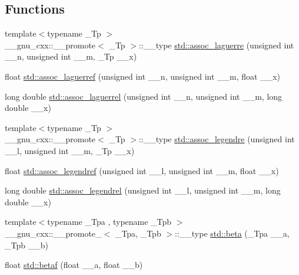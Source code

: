 \subsection*{Functions}
\begin{DoxyCompactItemize}
\item 
{\footnotesize template$<$typename \+\_\+\+Tp $>$ }\\\+\_\+\+\_\+gnu\+\_\+cxx\+::\+\_\+\+\_\+promote$<$ \+\_\+\+Tp $>$\+::\+\_\+\+\_\+type \hyperlink{group__tr29124__math__spec__func_ga377bb7e038c464a27dfe0573fd2d7b33}{std\+::assoc\+\_\+laguerre} (unsigned int \+\_\+\+\_\+n, unsigned int \+\_\+\+\_\+m, \+\_\+\+Tp \+\_\+\+\_\+x)
\item 
float \hyperlink{group__tr29124__math__spec__func_gaf83d98f350a1cfcebee6a1f723cf90d2}{std\+::assoc\+\_\+laguerref} (unsigned int \+\_\+\+\_\+n, unsigned int \+\_\+\+\_\+m, float \+\_\+\+\_\+x)
\item 
long double \hyperlink{group__tr29124__math__spec__func_gac8e245671fb2df5de5fd978d03081f6c}{std\+::assoc\+\_\+laguerrel} (unsigned int \+\_\+\+\_\+n, unsigned int \+\_\+\+\_\+m, long double \+\_\+\+\_\+x)
\item 
{\footnotesize template$<$typename \+\_\+\+Tp $>$ }\\\+\_\+\+\_\+gnu\+\_\+cxx\+::\+\_\+\+\_\+promote$<$ \+\_\+\+Tp $>$\+::\+\_\+\+\_\+type \hyperlink{group__tr29124__math__spec__func_ga355349f79119c1fd1e2a9351cec57f0f}{std\+::assoc\+\_\+legendre} (unsigned int \+\_\+\+\_\+l, unsigned int \+\_\+\+\_\+m, \+\_\+\+Tp \+\_\+\+\_\+x)
\item 
float \hyperlink{group__tr29124__math__spec__func_ga3ced07ddd24bf4af56e2712d148e7f57}{std\+::assoc\+\_\+legendref} (unsigned int \+\_\+\+\_\+l, unsigned int \+\_\+\+\_\+m, float \+\_\+\+\_\+x)
\item 
long double \hyperlink{group__tr29124__math__spec__func_ga55977b425a539146f060dec1c8003344}{std\+::assoc\+\_\+legendrel} (unsigned int \+\_\+\+\_\+l, unsigned int \+\_\+\+\_\+m, long double \+\_\+\+\_\+x)
\item 
{\footnotesize template$<$typename \+\_\+\+Tpa , typename \+\_\+\+Tpb $>$ }\\\+\_\+\+\_\+gnu\+\_\+cxx\+::\+\_\+\+\_\+promote\+\_$<$ \+\_\+\+Tpa, \+\_\+\+Tpb $>$\+::\+\_\+\+\_\+type \hyperlink{group__tr29124__math__spec__func_ga6a7220c87c942db48b18b527d92bbd2d}{std\+::beta} (\+\_\+\+Tpa \+\_\+\+\_\+a, \+\_\+\+Tpb \+\_\+\+\_\+b)
\item 
float \hyperlink{group__tr29124__math__spec__func_ga12dc61ee4c09172151cf092ed387e203}{std\+::betaf} (float \+\_\+\+\_\+a, float \+\_\+\+\_\+b)

\end{DoxyCompactItemize}
